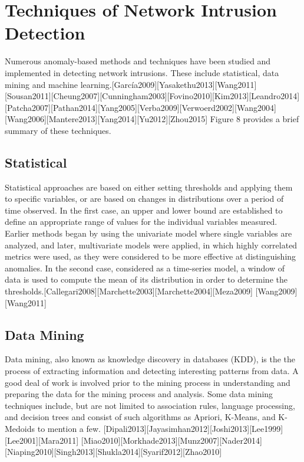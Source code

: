\documentclass[12pt,]{article}
\begin{document}
\pagebreak

\section{Techniques of Network Intrusion
Detection}\label{techniques-of-network-intrusion-detection}

Numerous anomaly-based methods and techniques have been studied and
implemented in detecting network intrusions. These include statistical,
data mining and machine
learning.{[}García2009{]}{[}Yasakethu2013{]}{[}Wang2011{]}{[}Sousan2011{]}{[}Cheung2007{]}{[}Cunningham2003{]}{[}Fovino2010{]}{[}Kim2013{]}{[}Leandro2014{]}{[}Patcha2007{]}{[}Pathan2014{]}{[}Yang2005{]}{[}Verba2009{]}{[}Verwoerd2002{]}{[}Wang2004{]}{[}Wang2006{]}{[}Mantere2013{]}{[}Yang2014{]}{[}Yu2012{]}{[}Zhou2015{]}
Figure 8 provides a brief summary of these techniques.

\subsection{Statistical}\label{statistical}

Statistical approaches are based on either setting thresholds and
applying them to specific variables, or are based on changes in
distributions over a period of time observed. In the first case, an
upper and lower bound are established to define an appropriate range of
values for the individual variables measured. Earlier methods began by
using the univariate model where single variables are analyzed, and
later, multivariate models were applied, in which highly correlated
metrics were used, as they were considered to be more effective at
distinguishing anomalies. In the second case, considered as a
time-series model, a window of data is used to compute the mean of its
distribution in order to determine the
thresholds.{[}Callegari2008{]}{[}Marchette2003{]}{[}Marchette2004{]}{[}Meza2009{]}
{[}Wang2009{]}{[}Wang2011{]}

\subsection{Data Mining}\label{data-mining}

Data mining, also known as knowledge discovery in databases (KDD), is
the the process of extracting information and detecting interesting
patterns from data. A good deal of work is involved prior to the mining
process in understanding and preparing the data for the mining process
and analysis. Some data mining techniques include, but are not limited
to association rules, language processing, and decision trees and
consist of such algorithms as Apriori, K-Means, and K-Medoids to mention
a few.
{[}Dipali2013{]}{[}Jayasimhan2012{]}{[}Joshi2013{]}{[}Lee1999{]}{[}Lee2001{]}{[}Mara2011{]}
{[}Miao2010{]}{[}Morkhade2013{]}{[}Munz2007{]}{[}Nader2014{]}{[}Niaping2010{]}{[}Singh2013{]}{[}Shukla2014{]}{[}Syarif2012{]}{[}Zhao2010{]}
\end{document}

